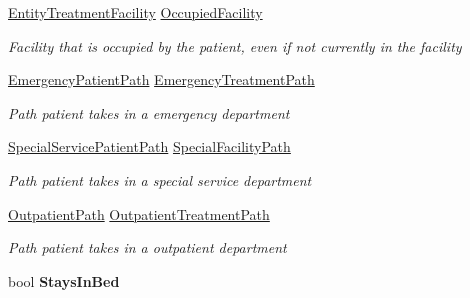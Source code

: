 \begin{DoxyCompactItemize}
\hyperlink{class_general_health_care_elements_1_1_entities_1_1_entity_treatment_facility}{Entity\+Treatment\+Facility} \hyperlink{class_general_health_care_elements_1_1_entities_1_1_entity_patient_af1ed1de9257c69d251cc055ec8604943}{Occupied\+Facility}
\begin{DoxyCompactList}\small\item\em Facility that is occupied by the patient, even if not currently in the facility \end{DoxyCompactList}\item 
\hyperlink{class_general_health_care_elements_1_1_department_models_1_1_emergency_1_1_emergency_patient_path}{Emergency\+Patient\+Path} \hyperlink{class_general_health_care_elements_1_1_entities_1_1_entity_patient_a42d60257bf253a6329b7c82d01607590}{Emergency\+Treatment\+Path}
\begin{DoxyCompactList}\small\item\em Path patient takes in a emergency department \end{DoxyCompactList}\item 
\hyperlink{class_general_health_care_elements_1_1_special_facility_1_1_special_service_patient_path}{Special\+Service\+Patient\+Path} \hyperlink{class_general_health_care_elements_1_1_entities_1_1_entity_patient_a20145fb2d1bb970985056d7004791960}{Special\+Facility\+Path}
\begin{DoxyCompactList}\small\item\em Path patient takes in a special service department \end{DoxyCompactList}\item 
\hyperlink{class_general_health_care_elements_1_1_department_models_1_1_outpatient_1_1_outpatient_path}{Outpatient\+Path} \hyperlink{class_general_health_care_elements_1_1_entities_1_1_entity_patient_a27ee6bd52e0308e6a37aa900538e82aa}{Outpatient\+Treatment\+Path}
\begin{DoxyCompactList}\small\item\em Path patient takes in a outpatient department \end{DoxyCompactList}\item 
bool {\bfseries Stays\+In\+Bed}\hypertarget{class_general_health_care_elements_1_1_entities_1_1_entity_patient_abc368510d443054200129cedd14795f6}{}\label{class_general_health_care_elements_1_1_entities_1_1_entity_patient_abc368510d443054200129cedd14795f6}

\end{DoxyCompactItemize}


